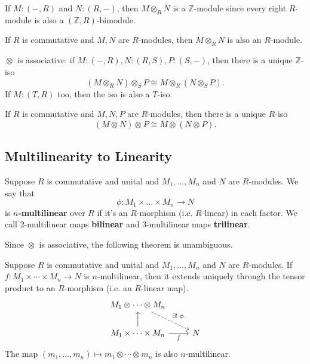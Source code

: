 \documentclass[twoside,10pt]{report}
\begin{document}
\begin{note}[]
	If $M:(-,R)$ and $N:(R,-)$, then $M \otimes_{R}N$ is a $\mathbb{Z}$-module since every right $R$-module is also a $(\mathbb{Z},R)$-bimodule.
\end{note}

\begin{cor}
If $R$ is commutative and $M,N$ are $R$-modules, then $M \otimes_{R}N$ is also an $R$-module.
\end{cor}

\begin{prop}
	$\otimes_{}$ is associative: if $M:(-,R), N:(R,S), P:(S,-)$, then there is a unique $\mathbb{Z}$-iso
	\[
		(M \otimes_{R}N)\otimes_{S}P \cong M\otimes_{R}(N\otimes_{S}P).
	\] If $M:(T,R)$ too, then the iso is also a $T$-iso.
\end{prop}

\begin{cor}
If $R$ is commutative and $M,N,P$ are $R$-modules, then there is a unique $R$-iso
\[
	(M\otimes_{}N)\otimes_{}P \cong M\otimes_{}(N\otimes_{}P).
\]
\end{cor}

\subsection{Multilinearity to Linearity}

\begin{defn}[]
Suppose $R$ is commutative and unital and ${M}_1, \dots, {M}_{n}$ and $N$ are $R$-modules. We say that
\[
\phi:{M}_1 \times \dots \times {M}_{n} \to N
\] is \textbf{$n$-multilinear} over $R$ if it's an $R$-morphism (i.e. $R$-linear) in each factor. We call 2-multilinear maps \textbf{bilinear} and 3-multilinear maps \textbf{trilinear}.
\end{defn}

Since $\otimes_{}$ is associative, the following theorem is unambiguous.

\begin{thrm}[]
Suppose $R$ is commutative and unital and ${M}_1, \dots, {M}_{n}$ and $N$ are $R$-modules. If $f:M_1\times \cdots \times M_n \to N$ is $n$-multilinear, then it extends uniquely through the tensor product to an $R$-morphism (i.e. an $R$-linear map).
\[
\begin{tikzcd}
	M_1 \otimes_{}\cdots \otimes_{}M_n \arrow[dr,dashed,"\exists!\;\phi"] \\
	M_1\times \cdots \times M_n \uar \rar["f"'] & N
\end{tikzcd}
\] The map $(m_1,\dots,m_n) \mapsto m_1\otimes_{}\cdots \otimes_{}m_n$ is also $n$-multilinear.
\end{thrm}
\end{document}
